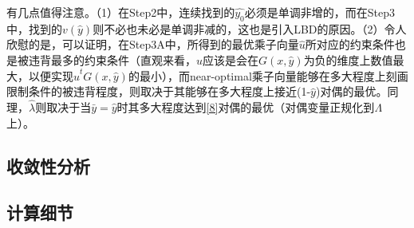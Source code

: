 \documentclass[UTF8,a4]{article}
\begin{document}
有几点值得注意。（1）在Step2中，连续找到的$\hat{y_0}$必须是单调非增的，而在Step3中，找到的$v(\hat{y})$则不必也未必是单调非减的，这也是引入LBD的原因。（2）令人欣慰的是，可以证明，在Step3A中，所得到的最优乘子向量$\hat{u}$所对应的约束条件也是被违背最多的约束条件（直观来看，$\hat{u}$应该是会在$G(x,\hat{y})$为负的维度上数值最大，以便实现$\hat{u}^tG(x,\hat{y})$的最小），而near-optimal乘子向量能够在多大程度上刻画限制条件的被违背程度，则取决于其能够在多大程度上接近(1-$\hat{y}$)对偶的最优。同理，$\hat{\lambda}$则取决于当$\bar{y}=\hat{y}$时其多大程度达到\eqref{8}对偶的最优（对偶变量正规化到$\Lambda$上）。

\subsection{收敛性分析}
\subsection{计算细节}
\end{document}
